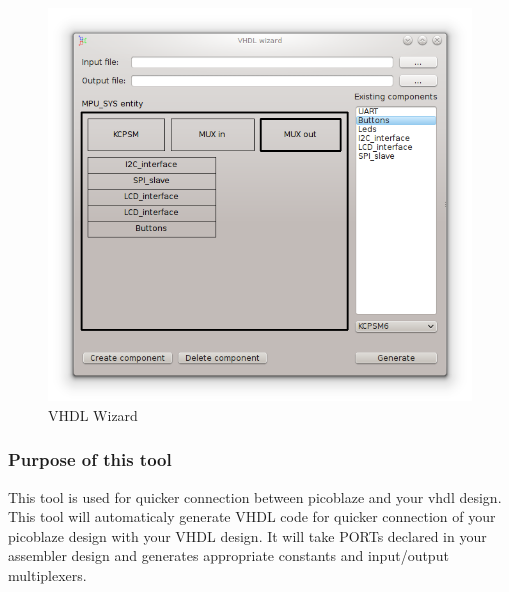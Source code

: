 \begin{figure}[h]
    \centering
    \includegraphics[width=.5\textwidth]{img/VHDL_wizard.png}
    \caption{VHDL Wizard}
\end{figure}

\subsubsection{Purpose of this tool}
    This tool is used for quicker connection between picoblaze and your vhdl design.
    This tool will automaticaly generate VHDL code for quicker connection of your picoblaze design with your VHDL design. It will take
    PORTs declared in your assembler design and generates appropriate constants and input/output multiplexers.

